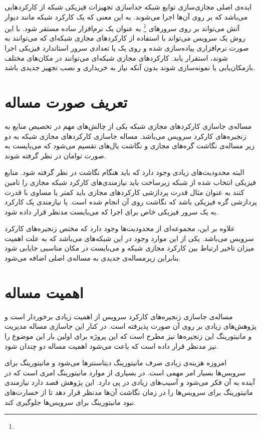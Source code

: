 ایده‌ی اصلی مجازی‌سازی توابع شبکه جداسازی تجهیزات فیزیکی شبکه از کارکردهایی می‌باشد که
بر روی آن‌ها اجرا می‌شوند.
به این معنی که یک کارکرد شبکه مانند دیوار آتش می‌تواند بر روی سرورهای
\footnote{}
به عنوان یک نرم‌افزار ساده مستقر شود.
با این روش یک سرویس می‌تواند با استفاده از کارکردهای مجازی شبکه‌ای که می‌توانند به صورت نرم‌افزاری پیاده‌سازی شده
و روی یک یا تعدادی سرور استاندارد فیزیکی اجرا شوند، استقرار یابد.
کارکردهای مجازی شبکه‌ای می‌توانند در مکان‌های مختلف بازمکان‌یابی یا نمونه‌سازی شوند بدون آنکه
نیاز به خریداری و نصب تجهیز جدیدی باشد.
\cite{Mijumbi2016}

\section{تعریف صورت مساله}
مساله‌ی جاسازی کارکردهای مجازی شبکه یکی از چالش‌های مهم در تخصیص منابع به زنجیره‌های کارکرد سرویس می‌باشد.
مساله جاسازی کارکردهای مجازی شبکه به دو زیر مساله‌ی نگاشت گره‌های مجازی و نگاشت یال‌های تقسیم می‌شود که می‌بایست
به صورت توامان در نظر گرفته شوند.

البته محدودیت‌های زیادی وجود دارد که باید هنگام نگاشت در نظر گرفته شود. منابع فیزیکی انتخاب شده
از شبکه زیرساخت باید نیازمندی‌های کارکرد شبکه مجازی را تامین کنند به عنوان مثال
قدرت پردازشی کارکرد‌های مجازی باید کمتر یا مساوی با قدرت پردازشی گره فیزیکی باشد که نگاشت
روی آن انجام شده است.
یا نیازمندی یک کارکرد به یک سرور فیزیکی خاص
برای اجرا که می‌بایست مدنظر قرار داده شود.

علاوه بر این، مجموعه‌ای از محدودیت‌ها وجود دارد که مختص زنجیره‌های کارکرد سرویس می‌باشد.
یکی از این موارد وجود
در این شبکه‌های می‌باشد که به علت اهمیت میزان تاخیر ارتباط بین کارکرد مجازی شبکه و
می‌بایست در مکان مناسبی جایابی شود بنابراین زیرمساله‌ی جدیدی به مساله‌ی اصلی اضافه می‌شود.

\section{اهمیت مساله}
مساله‌ی جاسازی زنجیره‌های کارکرد سرویس از اهمیت زیادی برخوردار است و پژوهش‌های زیادی
بر روی آن صورت پذیرفته است.
در کنار این جاسازی مساله مدیریت و مانیتورینگ این زنجیره‌ها نیز مطرح است
که این پروژه برای اولین بار این موضوع را نیز مدنظر قرار داده است که باعث می‌شود اهمیت
مساله دو چندان شود.

امروزه هزینه‌ی زیادی صرف مانیتورینگ دیتاسنترها می‌شود و مانیتورینگ برای سرویس‌ها بسیار امر مهمی است.
در بسیاری از موارد مانیتورینگ امری است که در آینده به آن فکر می‌شود و
آسیب‌های زیادی در پی دارد.
این پژوهش قصد دارد نیازمندی مانیتورینگ برای سرویس‌ها را در زمان نگاشت آن‌ها مدنظر قرار دهد تا
از خسارت‌های نبود مانیتورینگ برای سرویس‌ها جلوگیری کند.

